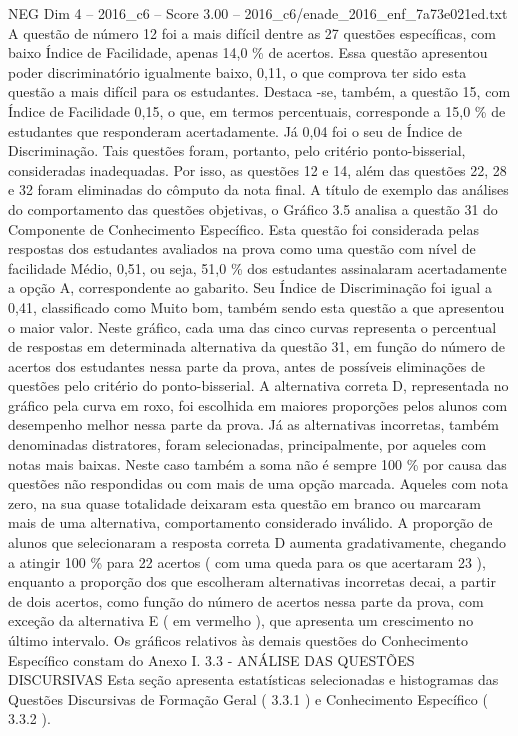 \begin{textsample}{NEG Dim 4 – 2016\_c6 – Score 3.00 – 2016\_c6/enade\_2016\_enf\_7a73e021ed.txt}
A questão de número 12 foi a mais difícil dentre as 27 questões específicas, com baixo Índice de Facilidade, apenas 14,0 \% de acertos.
Essa questão apresentou poder discriminatório igualmente baixo, 0,11, o que comprova ter sido esta questão a mais difícil para os estudantes.
Destaca -se, também, a questão 15, com Índice de Facilidade 0,15, o que, em termos percentuais, corresponde a 15,0 \% de estudantes que responderam acertadamente.
Já 0,04 foi o seu de Índice de Discriminação.
Tais questões foram, portanto, pelo critério ponto-bisserial, consideradas inadequadas.
Por isso, as questões 12 e 14, além das questões 22, 28 e 32 foram eliminadas do cômputo da nota final.
A título de exemplo das análises do comportamento das questões objetivas, o Gráfico 3.5 analisa a questão 31 do Componente de Conhecimento Específico.
Esta questão foi considerada pelas respostas dos estudantes avaliados na prova como uma questão com nível de facilidade Médio, 0,51, ou seja, 51,0 \% dos estudantes assinalaram acertadamente a opção A, correspondente ao gabarito.
Seu Índice de Discriminação foi igual a 0,41, classificado como Muito bom, também sendo esta questão a que apresentou o maior valor.
Neste gráfico, cada uma das cinco curvas representa o percentual de respostas em determinada alternativa da questão 31, em função do número de acertos dos estudantes nessa parte da prova, antes de possíveis eliminações de questões pelo critério do ponto-bisserial.
A alternativa correta D, representada no gráfico pela curva em roxo, foi escolhida em maiores proporções pelos alunos com desempenho melhor nessa parte da prova.
Já as alternativas incorretas, também denominadas distratores, foram selecionadas, principalmente, por aqueles com notas mais baixas.
Neste caso também a soma não é sempre 100 \% por causa das questões não respondidas ou com mais de uma opção marcada.
Aqueles com nota zero, na sua quase totalidade deixaram esta questão em branco ou marcaram mais de uma alternativa, comportamento considerado inválido.
A proporção de alunos que selecionaram a resposta correta D aumenta gradativamente, chegando a atingir 100 \% para 22 acertos ( com uma queda para os que acertaram 23 ), enquanto a proporção dos que escolheram alternativas incorretas decai, a partir de dois acertos, como função do número de acertos nessa parte da prova, com exceção da alternativa E ( em vermelho ), que apresenta um crescimento no último intervalo.
Os gráficos relativos às demais questões do Conhecimento Específico constam do Anexo I. 3.3 - ANÁLISE DAS QUESTÕES DISCURSIVAS Esta seção apresenta estatísticas selecionadas e histogramas das Questões Discursivas de Formação Geral ( 3.3.1 ) e Conhecimento Específico ( 3.3.2 ).

\end{textsample}
